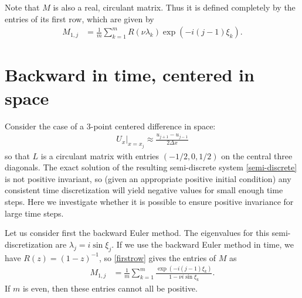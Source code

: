 \documentclass[a4paper]{article}
\newcommand{\dx}{\Delta x}
\begin{document}
Note that $M$ is also a real, circulant matrix.
Thus it is defined completely by the entries of its first row, which
are given by
\begin{align} \label{M-entries}
    M_{1,j} & = \frac{1}{m} \sum_{k=1}^m R(\nu\lambda_k) \exp(-i(j-1)\xi_k).
\end{align}

\section{Backward in time, centered in space}
Consider the case of a 3-point centered difference in space:
\begin{align}
    U_x|_{x=x_j} \approx \frac{u_{j+1}-u_{j-1}}{2\dx}
\end{align}
so that $L$ is a circulant matrix with entries $(-1/2, 0, 1/2)$ on the central
three diagonals.  The exact solution of the resulting semi-discrete
system \eqref{semi-discrete} is not positive invariant, so (given an appropriate
positive initial condition) any consistent time discretization will yield
negative values for small enough time steps.  Here we investigate whether
it is possible to ensure positive invariance for large time steps.

Let us consider first the backward Euler method.
The eigenvalues for this semi-discretization are $\lambda_j = i\sin\xi_j$.
If we use the backward Euler method in time, we have $R(z) = (1-z)^{-1}$, so
\eqref{firstrow} gives the entries of $M$ as
\begin{align} \label{firstrow}
    M_{1,j} & = \frac{1}{m} \sum_{k=1}^m \frac{\exp\left(-i(j-1)\xi_k\right)}{1-\nu i \sin\xi_k}.
\end{align}
If $m$ is even, then these entries cannot all be positive.
\end{document}
